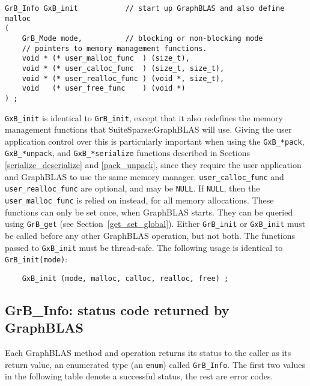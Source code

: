\documentclass[12pt]{article}
\begin{document}
\begin{mdframed}[userdefinedwidth=6in]
{\footnotesize
\begin{verbatim}
GrB_Info GxB_init           // start up GraphBLAS and also define malloc
(
    GrB_Mode mode,          // blocking or non-blocking mode
    // pointers to memory management functions.
    void * (* user_malloc_func  ) (size_t),
    void * (* user_calloc_func  ) (size_t, size_t),
    void * (* user_realloc_func ) (void *, size_t),
    void   (* user_free_func    ) (void *)
) ;
\end{verbatim}
}\end{mdframed}

\verb'GxB_init' is identical to \verb'GrB_init', except that it also redefines
the memory management functions that SuiteSparse:GraphBLAS will use.  Giving
the user application control over this is particularly important when using the
\verb'GxB_*pack',
\verb'GxB_*unpack', and \verb'GxB_*serialize' functions described in
Sections \ref{serialize_deserialize} and \ref{pack_unpack},
since they require the user application and
GraphBLAS to use the same memory manager.
\verb'user_calloc_func' and \verb'user_realloc_func' are optional, and
may be \verb'NULL'.  If \verb'NULL', then the \verb'user_malloc_func' is
relied on instead, for all memory allocations.
These functions can only be set once, when GraphBLAS starts.
They can be queried using \verb'GrB_get' (see
Section~\ref{get_set_global}).
Either
\verb'GrB_init' or \verb'GxB_init' must be called before any other GraphBLAS
operation, but not both.  The functions passed to \verb'GxB_init' must be
thread-safe.
The following usage is identical to \verb'GrB_init(mode)':

    {\footnotesize
    \begin{verbatim}
    GxB_init (mode, malloc, calloc, realloc, free) ; \end{verbatim}}

\newpage
\subsection{{\sf GrB\_Info:} status code returned by GraphBLAS} %
\label{info}

Each GraphBLAS method and operation returns its status to the caller as its
return value, an enumerated type (an \verb'enum') called \verb'GrB_Info'.  The
first two values in the following table denote a successful status, the rest
are error codes.
\end{document}
